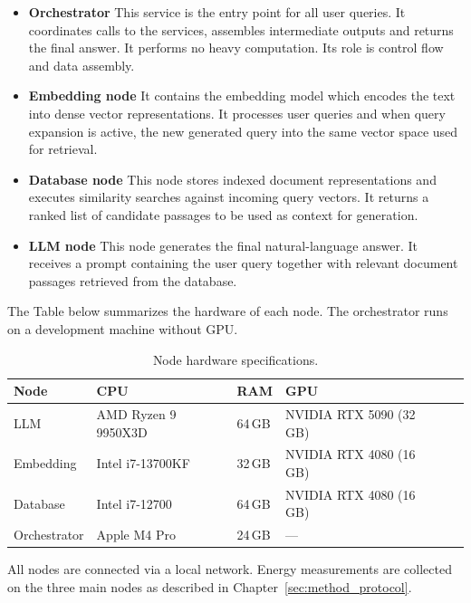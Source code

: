 \begin{itemize}
    \item \textbf{Orchestrator} This service is the entry point for all user queries. It coordinates calls to the 
services, assembles intermediate outputs and returns the final answer. It performs no 
heavy computation. Its role is control flow and data assembly.
    \item \textbf{Embedding node} It contains the embedding model which encodes the text into dense vector representations. It processes user queries and 
when query expansion is active, the new generated query into the same vector space used for 
retrieval.
    \item \textbf{Database node} This node stores indexed document representations and executes similarity searches against 
incoming query vectors. It returns a ranked list of candidate passages to be used as context 
for generation.
    \item \textbf{LLM node} This node generates the final natural-language answer. It receives a prompt containing 
the user query together with relevant document passages retrieved from the database.
\end{itemize}



The Table below summarizes the hardware of each node. The orchestrator runs 
on a development machine without GPU.

\begin{table}[h!]
\centering
\begin{tabular}{llllll}
\textbf{Node} & \textbf{CPU} & \textbf{RAM} & \textbf{GPU}\\
\hline
LLM          & AMD Ryzen 9 9950X3D & 64\,GB & NVIDIA RTX 5090 (32\,GB) \\
Embedding   &  Intel i7-13700KF    & 32\,GB & NVIDIA RTX 4080 (16\,GB) \\
Database    &  Intel i7-12700      & 64\,GB & NVIDIA RTX 4080 (16\,GB) \\
Orchestrator &  Apple M4 Pro         & 24\,GB & ---                      \\

\end{tabular}
\caption{Node hardware specifications.}
\label{tab:deployment}
\end{table}

All nodes are connected via a local network. Energy measurements are collected on the 
three main nodes as described in Chapter~\ref{sec:method_protocol}.


